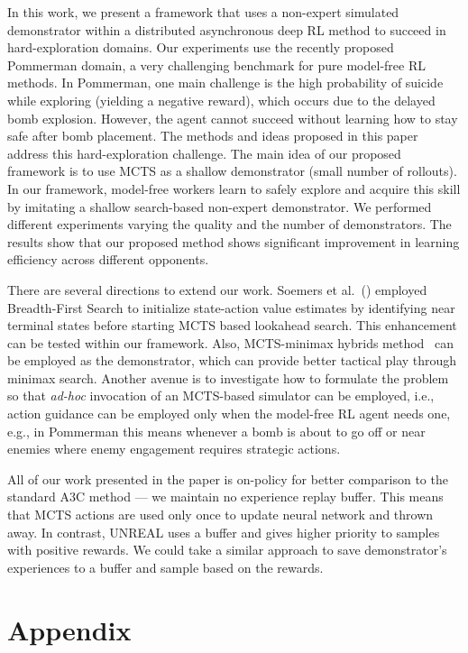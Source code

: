 \documentclass[letterpaper]{article} %
\begin{document}
In this work, we present a framework that uses a non-expert simulated demonstrator within a distributed asynchronous deep RL method to succeed in hard-exploration domains. Our experiments use the recently proposed Pommerman domain, a very challenging benchmark for pure model-free RL methods. In Pommerman, one main challenge is the high probability of suicide while exploring (yielding a negative reward), which occurs due to the delayed bomb explosion. However, the agent cannot succeed without learning how to stay safe after bomb placement. The methods and ideas proposed in this paper address this hard-exploration challenge. The main idea of our proposed framework is to use MCTS as a shallow demonstrator (small number of rollouts). In our framework, model-free workers learn to safely explore and acquire this skill by imitating a shallow search-based non-expert demonstrator. We performed different experiments varying the quality and the number of demonstrators. The results show that our proposed method shows significant improvement in learning efficiency across different opponents.

There are several directions to extend our work. Soemers et al.~(\citeyear{soemers2016enhancements}) employed Breadth-First Search to initialize state-action value estimates by identifying near terminal states before starting MCTS based lookahead search. This enhancement can be tested within our framework. Also, MCTS-minimax hybrids method~\cite{baier2018mcts} can be employed as the demonstrator, which can provide better tactical play through minimax search. Another avenue is to investigate how to formulate the problem so that \emph{ad-hoc} invocation of an MCTS-based simulator can be employed, i.e., action guidance can be employed only when the model-free RL agent needs one, e.g., in Pommerman this means whenever a bomb is about to go off or near enemies where enemy engagement requires strategic actions.

All of our work presented in the paper is on-policy for better comparison to the standard A3C method --- we maintain no experience replay buffer. This means that MCTS actions are used only once to update neural network and thrown away. In contrast, UNREAL uses a buffer and gives higher priority to samples with positive rewards. We could take a similar approach to save demonstrator's experiences to a buffer and sample based on the rewards.

\section*{Appendix}
\end{document}
